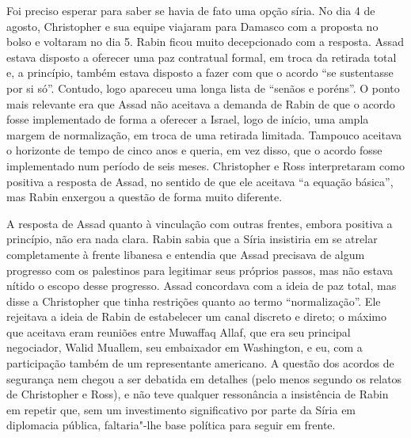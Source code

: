 Foi preciso esperar para saber se havia de fato uma opção síria. No dia
4 de agosto, Christopher e sua equipe viajaram para Damasco com a
proposta no bolso e voltaram no dia 5. Rabin ficou muito decepcionado
com a resposta. Assad estava disposto a oferecer uma paz contratual
formal, em troca da retirada total e, a princípio, também estava
disposto a fazer com que o acordo ``se sustentasse por si só''. Contudo,
logo apareceu uma longa lista de ``senãos e poréns''. O ponto mais
relevante era que Assad não aceitava a demanda de Rabin de que o acordo
fosse implementado de forma a oferecer a Israel, logo de início, uma
ampla margem de normalização, em troca de uma retirada limitada.
Tampouco aceitava o horizonte de tempo de cinco anos e queria, em vez
disso, que o acordo fosse implementado num período de seis meses.
Christopher e Ross interpretaram como positiva a resposta de Assad, no
sentido de que ele aceitava ``a equação básica'', mas Rabin enxergou a
questão de forma muito diferente.

A resposta de Assad quanto à vinculação com outras frentes, embora
positiva a princípio, não era nada clara. Rabin sabia que a Síria
insistiria em se atrelar completamente à frente libanesa e entendia que
Assad precisava de algum progresso com os palestinos para legitimar seus
próprios passos, mas não estava nítido o escopo desse progresso. Assad
concordava com a ideia de paz total, mas disse a Christopher que tinha
restrições quanto ao termo ``normalização''. Ele rejeitava a ideia de
Rabin de estabelecer um canal discreto e direto; o máximo que aceitava
eram reuniões entre Muwaffaq Allaf, que era seu principal negociador, Walid Muallem,
seu embaixador em Washington, e eu, com a participação também
de um representante americano. A questão dos acordos de segurança nem
chegou a ser debatida em detalhes (pelo menos segundo os relatos de
Christopher e Ross), e não teve qualquer ressonância a insistência de
Rabin em repetir que, sem um investimento significativo por parte da Síria em
diplomacia pública, faltaria"-lhe base política para seguir em frente.



